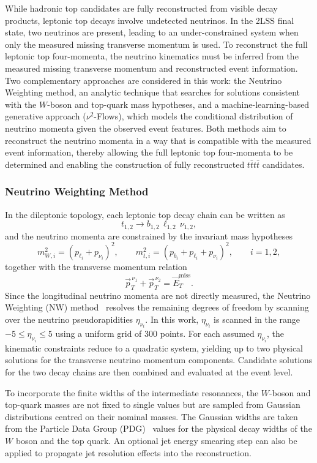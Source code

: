 While hadronic top candidates are fully reconstructed from visible decay products, leptonic top decays involve undetected neutrinos. 
In the 2LSS final state, two neutrinos are present, leading to an under-constrained system when only the measured missing transverse momentum is used.
To reconstruct the full leptonic top four-momenta, the neutrino kinematics must be inferred from the measured missing transverse momentum and reconstructed event information. 
Two complementary approaches are considered in this work: the Neutrino Weighting method, an analytic technique that searches for solutions consistent with the $W$-boson and top-quark mass hypotheses, and a machine-learning-based generative approach ($\nu^2$-Flows), which models the conditional distribution of neutrino momenta given the observed event features.
Both methods aim to reconstruct the neutrino momenta in a way that is compatible with the measured event information, thereby allowing the full leptonic top four-momenta to be determined and enabling the construction of fully reconstructed $t\bar{t}t\bar{t}$ candidates.

\subsubsection{Neutrino Weighting Method}

In the dileptonic topology, each leptonic top decay chain can be written as
%
\[
t_{1,2} \rightarrow b_{1,2}\,\ell_{1,2}\,\nu_{1,2},
\]
%
and the neutrino momenta are constrained by the invariant mass hypotheses
%
\[
m_{W,i}^2 = (p_{\ell_i}+p_{\nu_i})^2,\qquad
m_{t,i}^2 = (p_{b_i}+p_{\ell_i}+p_{\nu_i})^2,\qquad i=1,2,
\]
%
together with the transverse momentum relation
%
\[
\vec{p}_T^{\,\nu_1}+\vec{p}_T^{\,\nu_2}=\vec{E}_T^{\mathrm{miss}}.
\]
%
Since the longitudinal neutrino momenta are not directly measured, the Neutrino Weighting (NW) method~\cite{ATLAS2017TopMassAllHadronic} resolves the remaining degrees of freedom by scanning over the neutrino pseudorapidities $\eta_{\nu_i}$. 
In this work, $\eta_{\nu_i}$ is scanned in the range $-5\leq\eta_{\nu_i}\leq5$ using a uniform grid of 300 points. 
For each assumed $\eta_{\nu_i}$, the kinematic constraints reduce to a quadratic system, yielding up to two physical solutions for the transverse neutrino momentum components. 
Candidate solutions for the two decay chains are then combined and evaluated at the event level.

To incorporate the finite widths of the intermediate resonances, the $W$-boson and top-quark masses are not fixed to single values but are sampled from Gaussian distributions centred on their nominal masses.
The Gaussian widths are taken from the Particle Data Group (PDG)~\cite{ParticleDataGroup:2024cfk} values for the physical decay widths of the $W$ boson and the top quark. 
An optional jet energy smearing step can also be applied to propagate jet resolution effects into the reconstruction.

